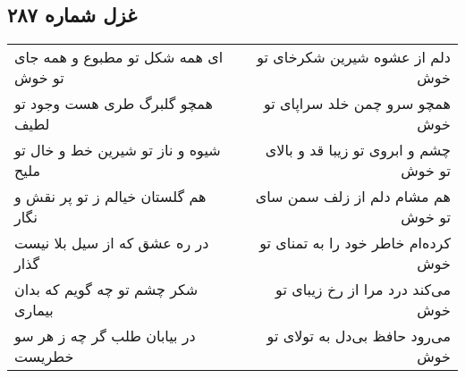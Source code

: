 \begin{center}
\section*{غزل شماره ۲۸۷}
\label{sec:sh287}
\begin{longtable}{l p{0.5cm} r}
ای همه شکل تو مطبوع و همه جای تو خوش
&&
دلم از عشوه شیرین شکرخای تو خوش
\\
همچو گلبرگ طری هست وجود تو لطیف
&&
همچو سرو چمن خلد سراپای تو خوش
\\
شیوه و ناز تو شیرین خط و خال تو ملیح
&&
چشم و ابروی تو زیبا قد و بالای تو خوش
\\
هم گلستان خیالم ز تو پر نقش و نگار
&&
هم مشام دلم از زلف سمن سای تو خوش
\\
در ره عشق که از سیل بلا نیست گذار
&&
کرده‌ام خاطر خود را به تمنای تو خوش
\\
شکر چشم تو چه گویم که بدان بیماری
&&
می‌کند درد مرا از رخ زیبای تو خوش
\\
در بیابان طلب گر چه ز هر سو خطریست
&&
می‌رود حافظ بی‌دل به تولای تو خوش
\\
\end{longtable}
\end{center}
